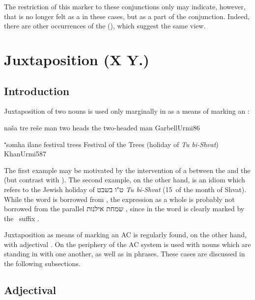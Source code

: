 The restriction of this marker to these conjunctions only may indicate, however, that  is no longer felt as a  in these cases, but as a part of the conjunction. Indeed, there are other occurrences of the   (), which suggest  the same view.




 \section{Juxtaposition (X Y.\opt{\agr})} \label{ss:JUrm_juxt}
 
\subsection{Introduction} 
 
 Juxtaposition of two nouns is used only marginally in \JUrm as a means of marking an :
 
 {naša tre reše}
 {man two heads}
 {the two-headed man}
 {GarbellUrmi}{86}
 
 {⁺səmha ilane}
 {festival trees}
 {Festival of the Trees (holiday of \textit{Tu bi-Shvat})}
 {KhanUrmi}{587}
 
 The first example may be motivated by the intervention of a  between the \prim and the \secn (but contrast with ). The second example, on the other hand, is an idiom which refers to the Jewish holiday of \texthebrew{ט"ו בשבט} \textit{Tu bi-Shvat} (15\th\ of the month of Shvat). While the word  is borrowed from  \citep[587]{KhanUrmi}, the expression as a whole is probably not borrowed from the  parallel \texthebrew{שמחת אילנות} , since in  the word  is clearly marked by the \fem\ \cst* suffix . 
 
 Juxtaposition as means of marking an AC is regularly found, on the other hand, with adjectival \secns. On the periphery of the AC system  is used with  nouns which are standing in  with one another, as well as in  phrases. These cases are discussed in the following subsections.  
 

 \subsection{Adjectival \secns} \label{ss:JUrm_juxt_adj}
 
